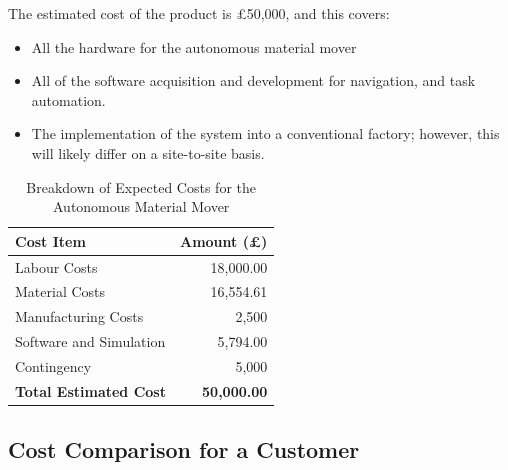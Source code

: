 \documentclass[12pt]{article}
\begin{document}
\begin{table}[H]
    \centering
    \begin{minipage}[t]{0.5\textwidth}
        \setlength{\parskip}{0pt} %
        \vspace{-10pt}
        The estimated cost of the product is £50,000, and this covers:
        \begin{itemize}
        \setlength{\itemsep}{1pt}
            \item All the hardware for the autonomous material mover
            \item All of the software acquisition and development for navigation, and task automation.
            \item The implementation of the system into a conventional factory; however, this will likely differ on a site-to-site basis.
        \end{itemize}
    \end{minipage}%
    \hfill
    \begin{minipage}[t]{0.45\textwidth}
        \centering
        \vspace{-10pt}
        \begin{tabular}{|l|r|}
            \hline
            \textbf{Cost Item}          & \textbf{Amount (£)} \\ \hline
            Labour Costs                 & 18,000.00           \\ \hline
            Material Costs              & 16,554.61           \\ \hline
            Manufacturing Costs         & 2,500               \\ \hline
            Software and Simulation     & 5,794.00            \\ \hline
            Contingency                 & 5,000            \\ \hline
            \textbf{Total Estimated Cost} & \textbf{50,000.00}  \\ \hline
        \end{tabular}
        \vspace{1pt} 
        \caption{Breakdown of Expected Costs for the Autonomous Material Mover}
        \label{tab:expected_costs}
    \end{minipage}
\end{table}


\subsection{Cost Comparison for a Customer}
\end{document}
